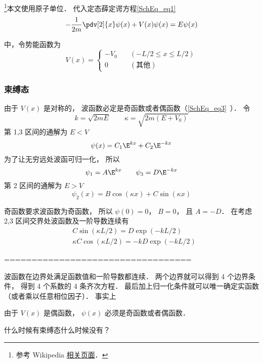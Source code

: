 




\footnote{参考 Wikipedia \href{https://en.wikipedia.org/wiki/Finite_potential_well}{相关页面}．}本文使用原子单位． 代入定态薛定谔方程\autoref{SchEq_eq1}~
\begin{equation}
-\frac{1}{2m}\pdv[2]{x}\psi(x) + V(x) \psi(x) = E \psi(x)
\end{equation}

中，令势能函数为
\begin{equation}
V(x) = \begin{cases}
-V_0 \quad &(-L/2 \leqslant x \leqslant L/2)\\
0 \quad &(\text{其他})
\end{cases}
\end{equation}

\subsubsection{束缚态}
由于 $V(x)$ 是对称的， 波函数必定是奇函数或者偶函数（\autoref{SchEq_eq3}~）． 令
\begin{equation}
k = \sqrt{2mE} \qquad \kappa = \sqrt{2m(E + V_0)}
\end{equation}
第 1,3 区间的通解为 $E < V$
\begin{equation}
\psi(x) = C_1 \E^{kx} + C_2 \E^{-kx}
\end{equation}
为了让无穷远处波函可归一化， 所以
\begin{equation}
\psi_1 = A \E^{kx} \qquad \psi_3 = D\E^{-kx}
\end{equation}
第 2 区间的通解为 $E > V$
\begin{equation}
\psi_2(x) = B \cos(\kappa x) + C\sin(\kappa x)
\end{equation}

奇函数要求波函数为奇函数， 所以 $\psi(0) = 0$， $B = 0$， 且 $A = -D$． 在考虑 2,3 区间交界处波函数及一阶导数连续有
\begin{equation}
\begin{aligned}
&C\sin(\kappa L/2) = D \exp(-kL/2)\\
&\kappa C \cos(\kappa L/2) = -kD \exp(-kL/2)
\end{aligned}
\end{equation}



==================================







波函数在边界处满足函数值和一阶导数都连续． 两个边界就可以得到 4 个边界条件， 得到 4 个系数的 4 条齐次方程． 最后加上归一化条件就可以唯一确定实函数（或者乘以任意相位因子）． 事实上


由于 $V(x)$ 是偶函数， $\psi(x)$ 必须是奇函数或者偶函数．




什么时候有束缚态什么时候没有？
